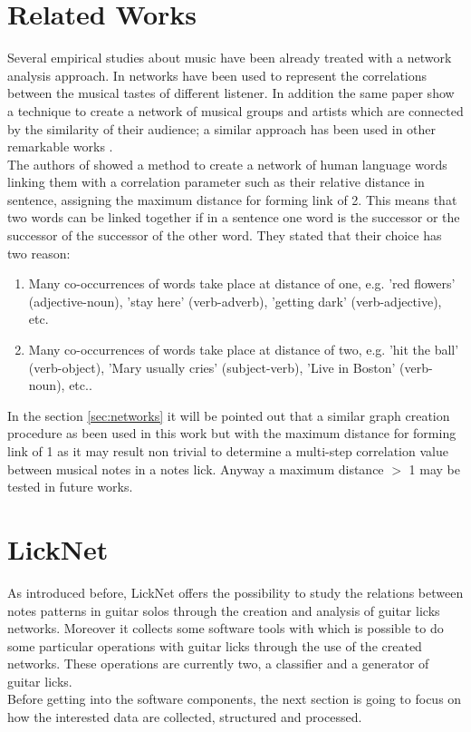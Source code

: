 \documentclass{llncs}
\begin{document}
\section{Related Works}
Several empirical studies about music have been already treated with a
network analysis approach. In \cite{music-genres} networks have been
used to represent the correlations between the musical tastes of
different listener. In addition the same paper show a technique to
create a network of musical groups and artists which are connected by
the similarity of their audience; a similar approach has been used in
other remarkable works \cite{artists-network}\cite{metal-network}.\\ 
The authors of \cite{sw-words} showed a method to create a network of human language words linking
them with a correlation parameter such as their relative distance in 
sentence, assigning the maximum distance for forming link of 2. This
means that two words can be linked together if in a sentence one word is the
successor or the successor of the successor of the other word. They
stated that their choice has two reason:
\begin{enumerate}
\item Many co-occurrences of
words take place at distance of one, e.g. 'red flowers' (adjective-noun), 
'stay here' (verb-adverb), 'getting dark' (verb-adjective), etc. 
\item Many co-occurrences of words take place at distance of two, e.g.
'hit the ball' (verb-object),
'Mary usually cries' (subject-verb), 'Live in Boston' (verb-noun), etc..
\end{enumerate}
In the section \ref{sec:networks} it will be pointed out  
that a similar graph creation procedure as been used in this work but
with the maximum distance for forming link of 1 as it may result non
trivial
to determine a multi-step correlation value between musical notes in a
notes lick.
Anyway a maximum distance $>$ 1 may be tested in future works.

\section{LickNet}
As introduced before, LickNet offers the possibility to study the
relations between notes patterns in guitar solos through the creation
and analysis of guitar licks networks. Moreover it collects
some software tools with which is possible to do some particular
operations with guitar licks through the use of the created networks.
These operations are currently two, a classifier and a generator of
guitar licks.\\
Before getting into the software components, the next section is going
to focus on how the interested data are collected, structured and processed. 
\end{document}
